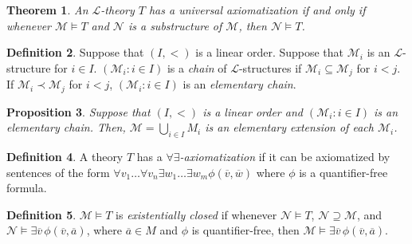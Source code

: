 \documentclass{amsart}
\newtheorem{theorem}{Theorem}[subsection]
\newtheorem{proposition}[theorem]{Proposition}
\theoremstyle{definition}
\newtheorem{definition}[theorem]{Definition}
\numberwithin{equation}{section}
\begin{document}
\begin{theorem}
  An $\mathcal{L}$-theory $T$ has a universal axiomatization if and only if
  whenever $\mathcal{M} \models T$ and $\mathcal{N}$ is a substructure of $\mathcal{M}$,
  then $\mathcal{N} \models T$.
\end{theorem}

\begin{definition}
  Suppose that $(I,<)$ is a linear order.
  Suppose that $\mathcal{M}_i$ is an $\mathcal{L}$-structure for $i \in I$.
  $(\mathcal{M}_i: i \in I)$ is a \emph{chain} of $\mathcal{L}$-structures if $\mathcal{M}_i \subseteq \mathcal{M}_j$ for $i < j$.
  If $\mathcal{M}_i \prec \mathcal{M}_j$ for $i < j$,
  $(\mathcal{M}_i: i \in I)$ is an \emph{elementary chain}.
\end{definition}

\begin{proposition}
  Suppose that $(I,<)$ is a linear order and
  $(\mathcal{M}_i: i \in I)$ is an elementary chain.
  Then, $\mathcal{M} = \bigcup_{i\in I} M_i$ is an elementary extension of each $\mathcal{M}_i$.
\end{proposition}

\begin{definition}
  A theory $T$ has a \emph{$\forall\exists$-axiomatization} if it can be axiomatized by sentences of
  the form $\forall v_1\dots\forall v_n \exists w_1\dots \exists w_m \phi(\overline{v},\overline{w})$
  where $\phi$ is a quantifier-free formula.
\end{definition}

\begin{definition}
  $\mathcal{M} \models T$ is \emph{existentially closed}
  if whenever $\mathcal{N} \models T$, $\mathcal{N} \supseteq \mathcal{M}$,
  and $\mathcal{N} \models \exists \overline{v}\, \phi(\overline{v},\overline{a})$,
  where $\overline{a} \in M$ and $\phi$ is quantifier-free,
  then $\mathcal{M} \models \exists \overline{v} \, \phi(\overline{v},\overline{a})$.
\end{definition}
\end{document}
